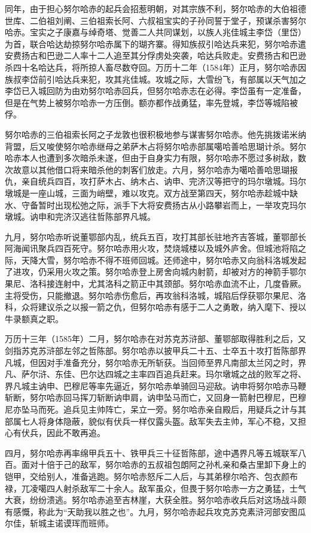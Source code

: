 同年，由于担心努尔哈赤的起兵会招惹明朝，对其宗族不利，努尔哈赤的大伯祖德世库、二伯祖刘阐、三伯祖索长阿、六叔祖宝实的子孙同誓于堂子，预谋杀害努尔哈赤。宝实之子康嘉与绰奇塔、觉善二人共同谋划，以族人兆佳城主李岱（里岱）为首，联合哈达劫掠努尔哈赤属下的瑚齐寨。得知族叔引哈达兵来犯，努尔哈赤遣安费扬古和巴逊二人率十二人追至其分俘虏处突袭，哈达兵败走。安费扬古和巴逊杀四十名哈达兵，将所掠人畜尽数夺回。万历十二年（1584年）正月，努尔哈赤因族叔李岱前引哈达兵来犯，攻其兆佳城。攻城之际，大雪纷飞，有部属以天气加之李岱已入城回防为由劝努尔哈赤回兵，但努尔哈赤志在必得。李岱虽有一定准备，但是在气势上被努尔哈赤一方压倒。额亦都作战勇猛，率先登城，李岱等城陷被俘。

努尔哈赤的三伯祖索长阿之子龙敦也很积极地参与谋害努尔哈赤。他先挑拨诺米纳背盟，后又唆使努尔哈赤继母之弟萨木占将努尔哈赤部属噶哈善哈思瑚计杀。努尔哈赤本人也遭到多次暗杀未遂，但由于自身实力有限，努尔哈赤不愿过多树敌，数次故意以其他借口将来暗杀他的刺客们放走。六月，努尔哈赤为噶哈善哈思瑚报仇，亲自统兵四百，攻打萨木占、纳木占、讷申、完济汉等把守的玛尔墩城。玛尔墩城是一座山城，三面为峭壁，难以攻克。双方战至第四天，努尔哈赤趁城中缺水、守备暂时出现松弛之际，派手下大将安费扬古从小路攀岩而上，一举攻克玛尔墩城。讷申和完济汉逃往哲陈部界凡城。

九月，努尔哈赤听说董鄂部内乱，统兵五百，攻打其部长驻地齐吉答城，董鄂部长阿海闻讯聚兵四百死守。努尔哈赤用火攻，焚烧城楼以及城外庐舍。但城池将陷之际，天降大雪，努尔哈赤不得不班师回城。还师途中，努尔哈赤又向翁科洛城发起了进攻，仍采用火攻之策。努尔哈赤登上房舍向城内射箭，却被对方的神箭手鄂尔果尼、洛科接连射中，尤其洛科之箭正中其颈部。努尔哈赤血流不止，几度昏厥。主将受伤，只能撤退。努尔哈赤伤愈后，再攻翁科洛城，城陷后俘获鄂尔果尼、洛科，众将建议杀之以报一箭之仇，但努尔哈赤有感于二人之勇敢，纳入麾下、授以牛录额真之职。

万历十三年（1585年）二月，努尔哈赤在对苏克苏浒部、董鄂部取得胜利之后，又剑指苏克苏浒部左邻之哲陈部。努尔哈赤以披甲兵二十五、士卒五十攻打哲陈部界凡城，但因对手准备充分，努尔哈赤无所斩获。当回师至界凡南部太兰冈之时，界凡、萨尔浒、东佳、巴尔达四城之主率四百追兵赶来。玛尔墩城之战的败军之将、界凡城主讷申、巴穆尼等率先逼近，努尔哈赤单骑回马迎敌。讷申将努尔哈赤马鞭斩断，努尔哈赤回马挥刀斩断讷申肩，讷申坠马而亡，又回身一箭射巴穆尼，巴穆尼亦坠马而死。追兵见主帅阵亡，呆立一旁。努尔哈赤亲自殿后，用疑兵之计与其部属七人将身体隐蔽，貌似有伏兵一样仅露头盔。敌军失去主帅，军心不稳，又担心有伏兵，因此不敢再追。

四月，努尔哈赤再率绵甲兵五十、铁甲兵三十征哲陈部，途中遇界凡等五城联军八百。面对十倍于己的敌军，努尔哈赤的五叔祖包朗阿之孙札亲和桑古里卸下身上的铠甲，交给别人，准备逃跑。努尔哈赤怒斥二人后，与其弟穆尔哈齐、包衣颜布禄，兀凌噶四人射杀敌军二十余人。敌军虽众，但畏于努尔哈赤一方之勇猛，士气大衰，纷纷溃逃。努尔哈赤追至吉林崖，大获全胜。努尔哈赤收兵后对这场战斗颇有感慨，称此为“天助我以胜之也”。九月，努尔哈赤起兵攻克苏克素浒河部安图瓜尔佳，斩城主诺谟珲而班师。

